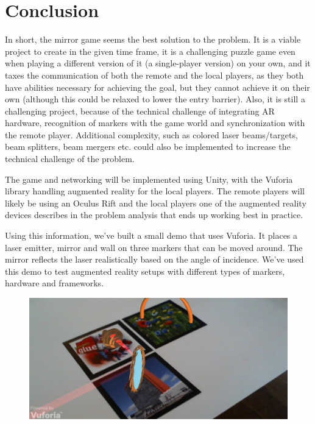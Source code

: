 \chapter{Conclusion} \label{cha:conclusion}
In short, the mirror game seems the best solution to the problem. It is a viable
project to create in the given time frame, it is a challenging puzzle game even
when playing a different version of it (a single-player version) on your own,
and it taxes the communication of both the remote and the local players, as they
both have abilities necessary for achieving the goal, but they cannot achieve it
on their own (although this could be relaxed to lower the entry barrier). Also,
it is still a challenging project, because of the technical challenge of
integrating AR hardware, recognition of markers with the game world and
synchronization with the remote player. Additional complexity, such as colored
laser beams/targets, beam splitters, beam mergers etc. could also be
implemented to increase the technical challenge of the problem.

The game and networking will be implemented using Unity, with the Vuforia
library handling augmented reality for the local players. The remote players
will likely be using an Oculus Rift and the local players one of the augmented
reality devices describes in the problem analysis that ends up working best in
practice.

Using this information, we've built a small demo that uses Vuforia. It places
a laser emitter, mirror and wall on three markers that can be moved around. The
mirror reflects the laser realistically based on the angle of incidence. We've
used this demo to test augmented reality setups with different types of markers,
hardware and frameworks.

\begin{figure}[h]
\includegraphics[width=\textwidth]{demo.png}
\end{figure}
